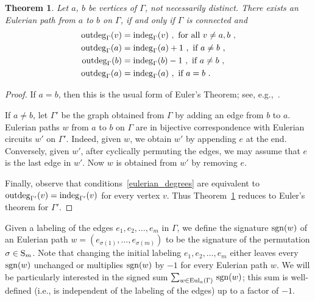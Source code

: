\documentclass{amsproc}
\newtheorem{theorem}{Theorem}[section]
\theoremstyle{definition}
\newtheorem{definition}[theorem]{Definition}
\theoremstyle{remark}
\numberwithin{equation}{section}
\newcommand{\Sym}{{\rm S}}
\newcommand{\sgn}{{\rm sgn}}
\newcommand{\indeg}{{\rm indeg}}
\newcommand{\outdeg}{{\rm outdeg}}
\newcommand{\uni}{{\rm Eul}}
\begin{document}
\begin{theorem} \label{eulerian_unic} 
Let $a$, $b$ be vertices of $\Gamma$, not necessarily distinct.
There exists an Eulerian path from $a$ to $b$ on $\Gamma$, if and only if $\Gamma$ is connected and 
\begin{equation}\label{eulerian_degrees}
\begin{split}
\outdeg_{\Gamma}(v)&=\indeg_{\Gamma}(v)\ , \text{ for all $v\neq a, b$}\ ,\\
\outdeg_{\Gamma}(a)&=\indeg_{\Gamma}(a)+1\ , \text{ if $a\neq b$}\ ,\\
\outdeg_{\Gamma}({b})&=\indeg_{\Gamma}({b})-1\ , \text{ if $a\neq b$}\ ,\\
\outdeg_{\Gamma}(a)&=\indeg_{\Gamma}(a)\ , \text{ if $a= b$}\ .
\end{split}
\end{equation}
\end{theorem}

\begin{proof} If $a = b$, then this is the usual form of Euler's Theorem; see, e.g.,~\cite[Theorems 12, 13]{bollobas}. 

If $a \neq b$, let $\Gamma'$ be the graph obtained from $\Gamma$ by adding an edge from $b$ to $a$.  Eulerian paths $w$ from $a$ to $b$ on $\Gamma$ 
are in bijective correspondence with Eulerian circuits $w'$ on $\Gamma'$. Indeed, given $w$, we obtain $w'$ by appending  $e$ at the end. 
Conversely, given $w'$, after cyclically permuting the edges, we may assume that $e$ is the last edge in $w'$. Now $w$ is obtained from $w'$ by removing $e$. 

Finally, observe that conditions~\eqref{eulerian_degrees} are equivalent to $\outdeg_{\Gamma'}(v) = \indeg_{\Gamma'}(v)$ for every vertex $v$. Thus
Theorem~\ref{eulerian_unic} reduces to Euler's theorem for $\Gamma'$.
\end{proof}


Given a labeling of the edges $e_1,e_2,\dots, e_m$ in $\Gamma$, we define the signature $\sgn(w)$ of an Eulerian path $w = (e_{\sigma(1)}, \ldots, e_{\sigma(m)})$ to be the signature of the permutation $\sigma \in \Sym_m$. Note that changing the initial labeling $e_1, e_2, \ldots, e_m$ either 
leaves every $\sgn(w)$ unchanged or multiplies $\sgn(w)$ by $-1$ for every Eulerian path $w$. We will be particularly interested in
the signed sum $\sum_{w \in \uni_a(\Gamma)} \, \sgn(w)$; this sum is well-defined (i.e., is independent of the labeling of the edges) up to a factor of $-1$.
\end{document}
